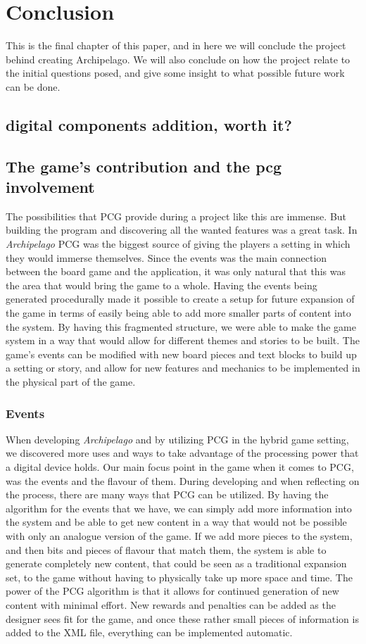\chapter{Conclusion}
This is the final chapter of this paper, and in here we will conclude the project behind creating Archipelago. We will also conclude on how the project relate to the initial questions posed, and give some insight to what possible future work can be done.


\section{digital components addition, worth it?}


\section{The game's contribution and the pcg involvement}
The possibilities that PCG provide during a project like this are immense. But building the program and discovering all the wanted features was a great task. In \textit{Archipelago} PCG was the biggest source of giving the players a setting in which they would immerse themselves. Since the events was the main connection between the board game and the application, it was only natural that this was the area that would bring the game to a whole. Having the events being generated procedurally made it possible to create a setup for future expansion of the game in terms of easily being able to add more smaller parts of content into the system. By having this fragmented structure, we were able to make the game system in a way that would allow for different themes and stories to be built. The game's events can be modified with new board pieces and text blocks to build up a setting or story, and allow for new features and mechanics to be implemented in the physical part of the game.

\subsection{Events}
When developing \textit{Archipelago} and by utilizing PCG in the hybrid game setting, we discovered more uses and ways to take advantage of the processing power that a digital device holds. Our main focus point in the game when it comes to PCG, was the events and the flavour of them. During developing and when reflecting on the process, there are many ways that PCG can be utilized. By having the algorithm for the events that we have, we can simply add more information into the system and be able to get new content in a way that would not be possible with only an analogue version of the game. If we add more pieces to the system, and then bits and pieces of flavour that match them, the system is able to generate completely new content, that could be seen as a traditional expansion set, to the game without having to physically take up more space and time. The power of the PCG algorithm is that it allows for continued generation of new content with minimal effort. New rewards and penalties can be added as the designer sees fit for the game, and once these rather small pieces of information is added to the XML file, everything can be implemented automatic.

